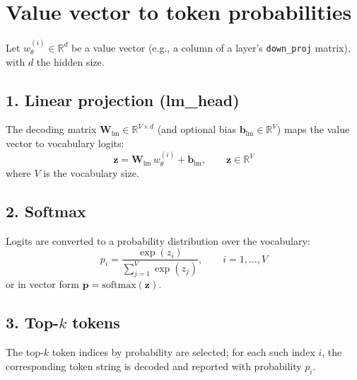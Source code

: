 \documentclass{article}
\begin{document}
\section*{Value vector to token probabilities}

Let \(w_{\theta}^{(i)} \in \mathbb{R}^{d}\) be a value vector (e.g., a column of a layer's \texttt{down\_proj} matrix), with \(d\) the hidden size.

\subsection*{1. Linear projection (lm\_head)}

The decoding matrix \(\mathbf{W}_{\text{lm}} \in \mathbb{R}^{V \times d}\) (and optional bias \(\mathbf{b}_{\text{lm}} \in \mathbb{R}^{V}\)) maps the value vector to vocabulary logits:
\begin{equation}
  \mathbf{z} = \mathbf{W}_{\text{lm}} \, w_{\theta}^{(i)} + \mathbf{b}_{\text{lm}}, \qquad \mathbf{z} \in \mathbb{R}^{V}
\end{equation}
where \(V\) is the vocabulary size.

\subsection*{2. Softmax}

Logits are converted to a probability distribution over the vocabulary:
\begin{equation}
  p_i = \frac{\exp(z_i)}{\sum_{j=1}^{V} \exp(z_j)}, \qquad i = 1, \ldots, V
\end{equation}
or in vector form \(\mathbf{p} = \mathrm{softmax}(\mathbf{z})\).

\subsection*{3. Top-$k$ tokens}

The top-$k$ token indices by probability are selected; for each such index \(i\), the corresponding token string is decoded and reported with probability \(p_i\).
\end{document}
